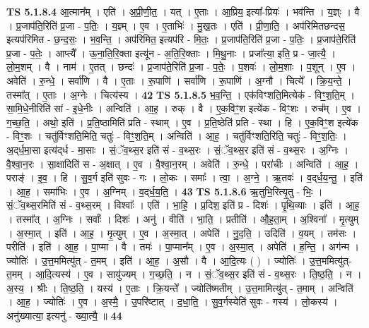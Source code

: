 \documentclass[17pt]{extarticle}
\begin{document}
                  \newline
                                \textbf{ TS 5.1.8.4} \newline
                  आ॒त्मान᳚म् । एति॑ । अ॒प्री॒णी॒त॒ । यत् । ए॒ताः । आ॒प्रिय॒ इत्या᳚-प्रियः॑ । भव॑न्ति । य॒ज्ञ्ः । वै । प्र॒जाप॑ति॒रिति॑ प्र॒जा - प॒तिः॒ । य॒ज्ञ्म् । ए॒व । ए॒ताभिः॑ । मु॒ख॒तः । एति॑ । प्री॒णा॒ति॒ । अप॑रिमितछन्दस॒ इत्यप॑रिमित - छ॒न्द॒सः॒ । भ॒व॒न्ति॒ । अप॑रिमित॒ इत्यप॑रि - मि॒तः॒ । प्र॒जाप॑ति॒रिति॑ प्र॒जा - प॒तिः॒ । प्र॒जाप॑ते॒रिति॑ प्र॒जा - प॒तेः॒ । आप्त्यै᳚ । ऊ॒ना॒ति॒रि॒क्ता इत्यू॑न - अ॒ति॒रि॒क्ताः । मि॒थु॒नाः । प्रजा᳚त्या॒ इति॒ प्र - जा॒त्यै॒ । लो॒म॒शम् । वै । नाम॑ । ए॒तत् । छन्दः॑ । प्र॒जाप॑ते॒रिति॑ प्र॒जा - प॒तेः॒ । प॒शवः॑ । लो॒म॒शाः । प॒शून् । ए॒व । अवेति॑ । रु॒न्धे॒ । सर्वा॑णि । वै । ए॒ताः । रू॒पाणि॑ । सर्वा॑णि । रू॒पाणि॑ । अ॒ग्नौ । चित्ये᳚ । क्रि॒य॒न्ते॒ । तस्मा᳚त् । ए॒ताः । अ॒ग्नेः । चित्य॑स्य । \textbf{  42} \newline
                  \newline
                                \textbf{ TS 5.1.8.5} \newline
                  भ॒व॒न्ति॒ । एक॑विꣳशति॒मित्येक॑ - विꣳ॒॒श॒ति॒म् । सा॒मि॒धे॒नीरिति॑ सां - इ॒धे॒नीः । अन्विति॑ । आ॒ह॒ । रुक् । वै । ए॒क॒विꣳ॒॒श इत्ये॑क - विꣳ॒॒शः । रुच᳚म् । ए॒व । ग॒च्छ॒ति॒ । अथो॒ इति॑ । प्र॒ति॒ष्ठामिति॑ प्रति - स्थाम् । ए॒व । प्र॒ति॒ष्ठेति॑ प्रति - स्था । हि । ए॒क॒विꣳ॒॒श इत्ये॑क - विꣳ॒॒शः । चतु॑र्विꣳशति॒मिति॒ चतुः॑ - विꣳ॒॒श॒ति॒म् । अन्विति॑ । आ॒ह॒ । चतु॑र्विꣳशति॒रिति॒ चतुः॑ - विꣳ॒॒श॒तिः॒ । अ॒द्‌र्ध॒मा॒सा इत्य॑द्‌र्ध - मा॒साः । सं॒ॅव॒थ्स॒र इति॑ सं - व॒थ्स॒रः । सं॒ॅव॒थ्स॒र इति॑ सं - व॒थ्स॒रः । अ॒ग्निः । वै॒श्वा॒न॒रः । सा॒क्षादिति॑ स - अ॒क्षात् । ए॒व । वै॒श्वा॒न॒रम् । अवेति॑ । रु॒न्धे॒ । परा॑चीः । अन्विति॑ । आ॒ह॒ । पराङ्॑ । इ॒व॒ । हि । सु॒व॒र्ग इति॑ सुवः - गः । लो॒कः । समाः᳚ । त्वा॒ । अ॒ग्ने॒ । ऋ॒तवः॑ । व॒द्‌र्ध॒य॒न्तु॒ । इति॑ । आ॒ह॒ । समा॑भिः । ए॒व । अ॒ग्निम् । व॒द्‌र्ध॒य॒ति॒ । \textbf{  43} \newline
                  \newline
                                \textbf{ TS 5.1.8.6} \newline
                  ऋ॒तुभि॒रित्यृ॒तु - भिः॒ । सं॒ॅव॒थ्स॒रमिति॑ सं - व॒थ्स॒रम् । विश्वाः᳚ । एति॑ । भा॒हि॒ । प्र॒दिश॒ इति॑ प्र - दिशः॑ । पृ॒थि॒व्याः । इति॑ । आ॒ह॒ । तस्मा᳚त् । अ॒ग्निः । सर्वाः᳚ । दिशः॑ । अनु॑ । वीति॑ । भा॒ति॒ । प्रतीति॑ । औ॒ह॒ता॒म् । अ॒श्विना᳚ । मृ॒त्युम् । अ॒स्मा॒त् । इति॑ । आ॒ह॒ । मृ॒त्युम् । ए॒व । अ॒स्मा॒त् । अपेति॑ । नु॒द॒ति॒ । उदिति॑ । व॒यम् । तम॑सः । परीति॑ । इति॑ । आ॒ह॒ । पा॒प्मा । वै । तमः॑ । पा॒प्मान᳚म् । ए॒व । अ॒स्मा॒त् । अपेति॑ । ह॒न्ति॒ । अग॑न्म । ज्योतिः॑ । उ॒त्त॒ममित्यु॑त् - त॒मम् । इति॑ । आ॒ह॒ । अ॒सौ । वै । आ॒दि॒त्यः ( ) । ज्योतिः॑ । उ॒त्त॒ममित्यु॑त्-त॒मम् । आ॒दि॒त्यस्य॑ । ए॒व । सायु॑ज्यम् । ग॒च्छ॒ति॒ । न । सं॒ॅव॒थ्स॒र इति॑ सं - व॒थ्स॒रः । ति॒ष्ठ॒ति॒ । न । अ॒स्य॒ । श्रीः । ति॒ष्ठ॒ति॒ । यस्य॑ । ए॒ताः । क्रि॒यन्ते᳚ । ज्योति॑ष्मतीम् । उ॒त्त॒मामित्यु॑त् - त॒माम् । अन्विति॑ । आ॒ह॒ । ज्योतिः॑ । ए॒व । अ॒स्मै॒ । उ॒परि॑ष्टात् । द॒धा॒ति॒ । सु॒व॒र्गस्येति॑ सुवः - गस्य॑ । लो॒कस्य॑ । अनु॑ख्यात्या॒ इत्यनु॑ - ख्या॒त्यै॒ ॥ \textbf{  44} \newline
\end{document}

